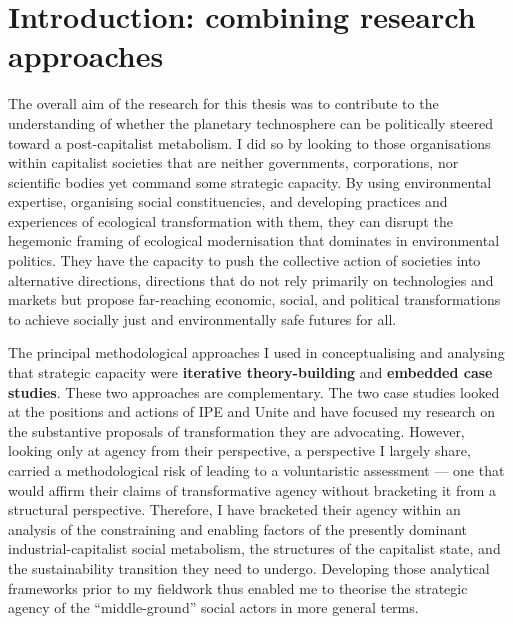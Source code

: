 \documentclass[a4paper, nobind]{templates/ociamthesis}
\begin{document}
\minitoc

\hypertarget{introduction-combining-research-approaches}{%
\section{Introduction: combining research approaches}\label{introduction-combining-research-approaches}}

The overall aim of the research for this thesis was to contribute to the understanding of whether the planetary technosphere can be politically steered toward a post-capitalist metabolism. I did so by looking to those organisations within capitalist societies that are neither governments, corporations, nor scientific bodies yet command some strategic capacity. By using environmental expertise, organising social constituencies, and developing practices and experiences of ecological transformation with them, they can disrupt the hegemonic framing of ecological modernisation that dominates in environmental politics. They have the capacity to push the collective action of societies into alternative directions, directions that do not rely primarily on technologies and markets but propose far-reaching economic, social, and political transformations to achieve socially just and environmentally safe futures for all.

The principal methodological approaches I used in conceptualising and analysing that strategic capacity were \textbf{iterative theory-building} and \textbf{embedded case studies}. These two approaches are complementary. The two case studies looked at the positions and actions of IPE and Unite and have focused my research on the substantive proposals of transformation they are advocating. However, looking only at agency from their perspective, a perspective I largely share, carried a methodological risk of leading to a voluntaristic assessment --- one that would affirm their claims of transformative agency without bracketing it from a structural perspective. Therefore, I have bracketed their agency within an analysis of the constraining and enabling factors of the presently dominant industrial-capitalist social metabolism, the structures of the capitalist state, and the sustainability transition they need to undergo. Developing those analytical frameworks prior to my fieldwork thus enabled me to theorise the strategic agency of the ``middle-ground'' social actors in more general terms.
\end{document}
